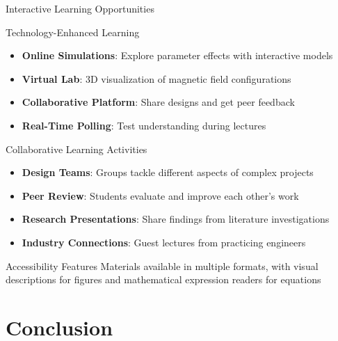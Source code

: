 \documentclass[aspectratio=169,xcolor={table,dvipsnames}]{beamer}
\begin{document}
\begin{frame}{Interactive Learning Opportunities}
    \begin{block}{Technology-Enhanced Learning}
        \begin{itemize}
            \item \textbf{Online Simulations}: Explore parameter effects with interactive models
            \item \textbf{Virtual Lab}: 3D visualization of magnetic field configurations
            \item \textbf{Collaborative Platform}: Share designs and get peer feedback
            \item \textbf{Real-Time Polling}: Test understanding during lectures
        \end{itemize}
    \end{block}
    
    \begin{block}{Collaborative Learning Activities}
        \begin{itemize}
            \item \textbf{Design Teams}: Groups tackle different aspects of complex projects
            \item \textbf{Peer Review}: Students evaluate and improve each other's work
            \item \textbf{Research Presentations}: Share findings from literature investigations
            \item \textbf{Industry Connections}: Guest lectures from practicing engineers
        \end{itemize}
    \end{block}
    
    \begin{alertblock}{Accessibility Features}
        Materials available in multiple formats, with visual descriptions for figures and mathematical expression readers for equations
    \end{alertblock}
\end{frame}

\section{Conclusion}
\end{document}
